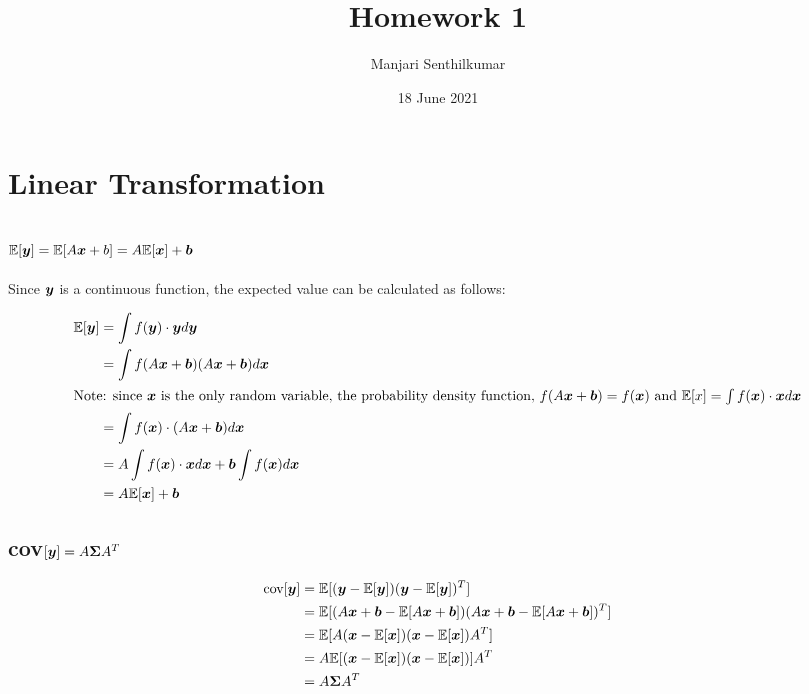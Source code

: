 \documentclass{article}
\title{Homework 1}
\author{Manjari Senthilkumar}
\date{18 June 2021}
\begin{document}
\maketitle

\section{Linear Transformation}
\subsection{$\mathbb{E}[\vb*{y}] = \mathbb{E}[A\vb*{x}+b] = A\mathbb{E}[\vb*{x}]+\vb*{b}$}

Since $\vb*{y}$ is a continuous function, the expected value can be calculated as follows:

\begin{align*}
    \mathbb{E}[\vb*{y}] 
        & = \int f(\vb*{y}) \cdot \vb*{y} d\vb*{y}    \\ 
        & = \int f(A\vb*{x}+\vb*{b}) (A\vb*{x} + \vb*{b}) d\vb*{x} \\
    \intertext{Note: since $\vb*{x}$ is the only random variable, the probability density function, $f(A\vb*{x}+ \vb*{b}) = f(\vb*{x})$ and $\mathbb{E}[x] = \int f(\vb*{x}) \cdot \vb*{x} d\vb*{x}$} 
        & = \int f(\vb*{x}) \cdot (A\vb*{x} + \vb*{b}) d\vb*{x} \\
        & = A \int f(\vb*{x}) \cdot \vb*{x} d\vb*{x} + \vb*{b} \int f(\vb*{x})d\vb*{x} \\
        & = A\mathbb{E}[\vb*{x}] + \vb*{b} 
\end{align*}

\subsection{cov$[\vb*{y}] = A {\bf \Sigma} A^T$}
\begin{align*}
    \text{cov}[\vb*{y}] 
        & = \mathbb{E}[(\vb*{y} - \mathbb{E}[\vb*{y}])(\vb*{y} - \mathbb{E}[\vb*{y}])^T] \\
        & = \mathbb{E}[(A\vb*{x} + \vb*{b} - \mathbb{E}[A\vb*{x}+\vb*{b}])  
        (A\vb*{x} + \vb*{b} - \mathbb{E}[A\vb*{x}+\vb*{b}])^T] \\
        & = \mathbb{E}[A(\vb*{x} - \mathbb{E}[\vb*{x}]) 
        (\vb*{x} - \mathbb{E}[\vb*{x}])A^T] \\
        & = A\mathbb{E}[(\vb*{x} - \mathbb{E}[\vb*{x}]) (\vb*{x} - \mathbb{E}[\vb*{x}])]A^T \\
        & = A {\bf \Sigma} A^T
\end{align*}
\end{document}
